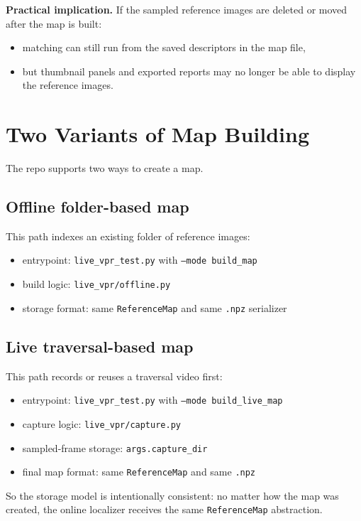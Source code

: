 \documentclass[11pt]{article}
\newcommand{\file}[1]{\texttt{#1}}
\newcommand{\code}[1]{\texttt{#1}}
\begin{document}
\textbf{Practical implication.} If the sampled reference images are deleted or moved after the map is built:

\begin{itemize}[leftmargin=*]
  \item matching can still run from the saved descriptors in the map file,
  \item but thumbnail panels and exported reports may no longer be able to display the reference images.
\end{itemize}

\section{Two Variants of Map Building}
The repo supports two ways to create a map.

\subsection{Offline folder-based map}
This path indexes an existing folder of reference images:

\begin{itemize}[leftmargin=*]
  \item entrypoint: \file{live\_vpr\_test.py} with \code{--mode build\_map}
  \item build logic: \file{live\_vpr/offline.py}
  \item storage format: same \file{ReferenceMap} and same \file{.npz} serializer
\end{itemize}

\subsection{Live traversal-based map}
This path records or reuses a traversal video first:

\begin{itemize}[leftmargin=*]
  \item entrypoint: \file{live\_vpr\_test.py} with \code{--mode build\_live\_map}
  \item capture logic: \file{live\_vpr/capture.py}
  \item sampled-frame storage: \file{args.capture\_dir}
  \item final map format: same \file{ReferenceMap} and same \file{.npz}
\end{itemize}

So the storage model is intentionally consistent: no matter how the map was created, the online localizer receives the same \code{ReferenceMap} abstraction.
\end{document}
